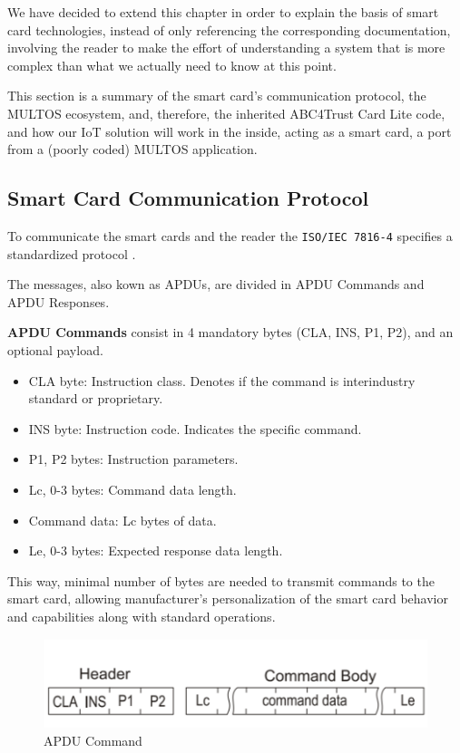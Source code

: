 We have decided to extend this chapter in order to explain the basis of smart card technologies, instead of only referencing the corresponding documentation, involving the reader to make the effort of understanding a system that is more complex than what we actually need to know at this point.

This section is a summary of the smart card's communication protocol, the MULTOS ecosystem, and, therefore, the inherited ABC4Trust Card Lite code, and how our IoT solution will work in the inside, acting as a smart card, a port from a (poorly coded) MULTOS application.


\subsection{Smart Card Communication Protocol}\label{subsec:APDU}

To communicate the smart cards and the reader the \texttt{ISO/IEC 7816-4} \citep{APDUISO} specifies a standardized protocol .

The messages, also kown as \acp{APDU}, are divided in APDU Commands and APDU Responses.

\textbf{APDU Commands} consist in 4 mandatory bytes (CLA, INS, P1, P2), and an optional payload.

\begin{itemize}
	\item CLA byte: Instruction class. Denotes if the command is interindustry standard or proprietary.
	\item INS byte: Instruction code. Indicates the specific command.
	\item P1, P2 bytes: Instruction parameters.
	\item Lc, 0-3 bytes: Command data length.
	\item Command data: Lc bytes of data.
	\item Le, 0-3 bytes: Expected response data length.
\end{itemize}

This way, minimal number of bytes are needed to transmit commands to the smart card, allowing manufacturer's personalization of the smart card behavior and capabilities along with standard operations.

\begin{figure}[bth]
	\begin{center}
		\includegraphics[width=0.55\linewidth]{gfx/APDUCommand}
	\end{center}
	\caption{APDU Command}
	\label{fig:APDUCommand}
\end{figure}



